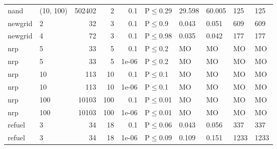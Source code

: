\begin{longtable}{llrrrlllll}
 nand          & (10, 100) & 	502402 &   2 & 0.1   & P$\leq$0.29  & 29.598  & 60.005  & 125    & 125    \\
 newgrid       & 2         &     	32 &   3 & 0.1   & P$\leq$0.9   & 0.043   & 0.051   & 609    & 609    \\
 newgrid       & 4         &     	72 &   3 & 0.1   & P$\leq$0.98  & 0.035   & 0.042   & 177    & 177    \\
 nrp           & 5         &     	33 &   5 & 0.1   & P$\leq$0.2   & MO      & MO      & MO     & MO     \\
 nrp           & 5         &     	33 &   5 & 1e-06 & P$\leq$0.2   & MO      & MO      & MO     & MO     \\
 nrp           & 10        &    	113 &  10 & 0.1   & P$\leq$0.1   & MO      & MO      & MO     & MO     \\
 nrp           & 10        &    	113 &  10 & 1e-06 & P$\leq$0.1   & MO      & MO      & MO     & MO     \\
 nrp           & 100       &  	10103 & 100 & 0.1   & P$\leq$0.01  & MO      & MO      & MO     & MO     \\
 nrp           & 100       &  	10103 & 100 & 1e-06 & P$\leq$0.01  & MO      & MO      & MO     & MO     \\
 refuel        & 3         &     	34 &  18 & 0.1   & P$\leq$0.06  & 0.043   & 0.056   & 337    & 337    \\
 refuel        & 3         &     	34 &  18 & 1e-06 & P$\leq$0.09  & 0.109   & 0.151   & 1233   & 1233   \\
\bottomrule
\end{longtable}
